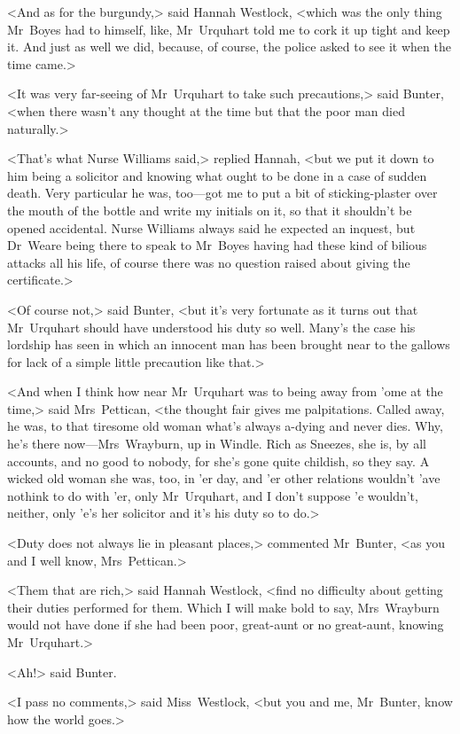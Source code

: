 <And as for the burgundy,> said Hannah Westlock, <which was the only thing Mr~Boyes had to himself, like, Mr~Urquhart told me to cork it up tight and keep it. And just as well we did, because, of course, the police asked to see it when the time came.>

<It was very far-seeing of Mr~Urquhart to take such precautions,> said Bunter, <when there wasn't any thought at the time but that the poor man died naturally.>

<That's what Nurse Williams said,> replied Hannah, <but we put it down to him being a solicitor and knowing what ought to be done in a case of sudden death. Very particular he was, too—got me to put a bit of sticking-plaster over the mouth of the bottle and write my initials on it, so that it shouldn't be opened accidental. Nurse Williams always said he expected an inquest, but Dr~Weare being there to speak to Mr~Boyes having had these kind of bilious attacks all his life, of course there was no question raised about giving the certificate.>

<Of course not,> said Bunter, <but it's very fortunate as it turns out that Mr~Urquhart should have understood his duty so well. Many's the case his lordship has seen in which an innocent man has been brought near to the gallows for lack of a simple little precaution like that.>

<And when I think how near Mr~Urquhart was to being away from 'ome at the time,> said Mrs~Pettican, <the thought fair gives me palpitations. Called away, he was, to that tiresome old woman what's always a-dying and never dies. Why, he's there now—Mrs~Wrayburn, up in Windle. Rich as Sneezes, she is, by all accounts, and no good to nobody, for she's gone quite childish, so they say. A wicked old woman she was, too, in 'er day, and 'er other relations wouldn't 'ave nothink to do with 'er, only Mr~Urquhart, and I don't suppose 'e wouldn't, neither, only 'e's her solicitor and it's his duty so to do.>

<Duty does not always lie in pleasant places,> commented Mr~Bunter, <as you and I well know, Mrs~Pettican.>

<Them that are rich,> said Hannah Westlock, <find no difficulty about getting their duties performed for them. Which I will make bold to say, Mrs~Wrayburn would not have done if she had been poor, great-aunt or no great-aunt, knowing Mr~Urquhart.>

<Ah!> said Bunter.

<I pass no comments,> said Miss~Westlock, <but you and me, Mr~Bunter, know how the world goes.>

